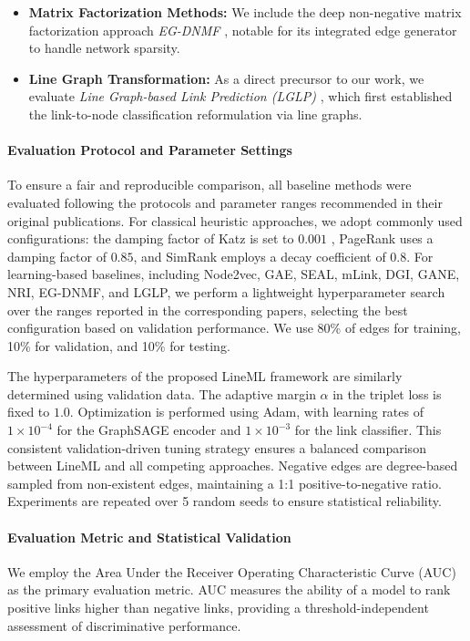 \documentclass[pdflatex,sn-mathphys-num]{sn-jnl}%
\theoremstyle{thmstyleone}%
\theoremstyle{thmstyletwo}%
\theoremstyle{thmstylethree}%
\theoremstyle{plain} %
\theoremstyle{definition} %
\theoremstyle{remark} %
\theoremstyle{plain} %
\begin{document}
\begin{itemize}
    \item \textbf{Matrix Factorization Methods:} We include the deep non-negative matrix factorization approach \textit{EG-DNMF} \cite{yao2024deep}, notable for its integrated edge generator to handle network sparsity.
    
    \item \textbf{Line Graph Transformation:} As a direct precursor to our work, we evaluate \textit{Line Graph-based Link Prediction (LGLP)} \cite{cai2021line}, which first established the link-to-node classification reformulation via line graphs.
\end{itemize}

\paragraph{Evaluation Protocol and Parameter Settings}
To ensure a fair and reproducible comparison, all baseline methods were evaluated following the protocols and parameter ranges recommended in their original publications. 
For classical heuristic approaches, we adopt commonly used configurations: the damping factor of Katz is set to \(0.001\) \cite{cai2021line,33cai2020multi}, 
PageRank uses a damping factor of \(0.85\), and 
SimRank employs a decay coefficient of \(0.8\). 
For learning-based baselines, including Node2vec, GAE, SEAL, mLink, DGI, GANE, NRI, EG-DNMF, and LGLP, we perform a lightweight hyperparameter search over the ranges reported in the corresponding papers, selecting the best configuration based on validation performance. 
We use 80\% of edges for training, 10\% for validation, and 10\% for testing. 

The hyperparameters of the proposed LineML framework are similarly determined using validation data. The adaptive margin \(\alpha\) in the triplet loss is fixed to \(1.0\). Optimization is performed using Adam, with learning rates of \(1\times10^{-4}\) for the GraphSAGE encoder and \(1\times10^{-3}\) for the link classifier. This consistent validation-driven tuning strategy ensures a balanced comparison between LineML and all competing approaches.
Negative edges are  degree-based sampled from non-existent edges, maintaining a 1:1 positive-to-negative ratio. Experiments are repeated over 5 random seeds to ensure statistical reliability.


\paragraph{Evaluation Metric and Statistical Validation}
We employ the Area Under the Receiver Operating Characteristic Curve (AUC) as the primary evaluation metric. 
AUC measures the ability of a model to rank positive links higher than negative links, providing a threshold-independent assessment of discriminative performance.
\end{document}
